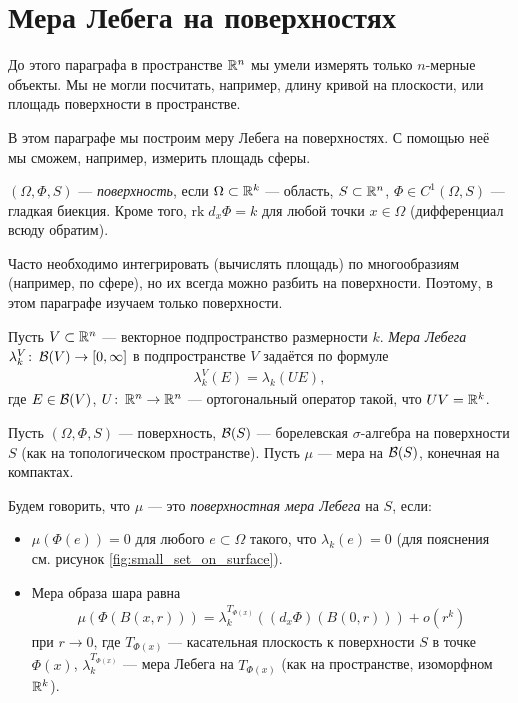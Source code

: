 
\section{Мера Лебега на поверхностях}

До этого параграфа в пространстве $\mathbb{R}^{n}$ мы умели измерять только $n$-мерные объекты. Мы не могли посчитать, например, длину кривой на плоскости, или площадь поверхности в пространстве.

В этом параграфе мы построим меру Лебега на поверхностях. С помощью неё мы сможем, например, измерить площадь сферы.

\begin{df}
 \label{definition:surface}
 $(\Omega, \Phi, S)$ --- \textit{поверхность}, если $\Omega \subset \mathbb{R}^{k}$ --- область, $S \subset \mathbb{R}^{n}$, $\Phi \in C^{1}(\Omega, S)$ --- гладкая биекция. Кроме того, $\mathrm{rk}\; d_{x} \Phi = k$ для любой точки $x \in \Omega$ (дифференциал всюду обратим).
\end{df}
\begin{remrk*}
 Часто необходимо интегрировать (вычислять площадь) по многообразиям (например, по сфере), но их всегда можно разбить на поверхности. Поэтому, в этом параграфе изучаем только поверхности.
\end{remrk*}

\begin{df}
 Пусть $V \subset \mathbb{R}^{n}$ --- векторное подпространство размерности $k$. \textit{Мера Лебега} $\lambda_k^{V} \colon\, \mathcal{B}(V) \to [0, \infty]$ в подпространстве $V$ задаётся по формуле
 \begin{align*}
  \lambda_k^{V}(E) = \lambda_k(UE)
 ,\end{align*} где $E \in \mathcal{B}(V)$, $U \colon\, \mathbb{R}^{n} \to \mathbb{R}^{n}$ --- ортогональный оператор такой, что $UV = \mathbb{R}^{k}$.
\end{df}

\begin{df}
 \label{definition:lebesgue_measure_on_surface}
 Пусть $(\Omega, \Phi, S)$ --- поверхность, $\mathcal{B}(S)$ --- борелевская $\sigma$-алгебра на поверхности $S$ (как на топологическом пространстве). Пусть $\mu$ --- мера на $\mathcal{B}(S)$, конечная на компактах.

 Будем говорить, что $\mu$ --- это \textit{поверхностная мера Лебега} на $S$, если:
 \begin{itemize}
  \item $\mu(\Phi(e)) = 0$ для любого $e \subset \Omega$ такого, что $\lambda_k(e) = 0$ (для пояснения см. рисунок \ref{fig:small_set_on_surface}).
  \item Мера образа шара равна 
\begin{align}
 \label{equation:surface_lebesgue_measure_ball}
\mu(\Phi(B(x,r))) = \lambda_k^{T_{\Phi(x)}}((d_x \Phi)(B(0, r))) + o(r^{k})
\end{align}
при $r \to 0$, где $T_{\Phi(x)}$ --- касательная плоскость к поверхности $S$ в точке $\Phi(x)$, $\lambda_k^{T_{\Phi(x)}}$ --- мера Лебега на $T_{\Phi(x)}$ (как на пространстве, изоморфном $\mathbb{R}^{k}$).
 \end{itemize}
\end{df}

